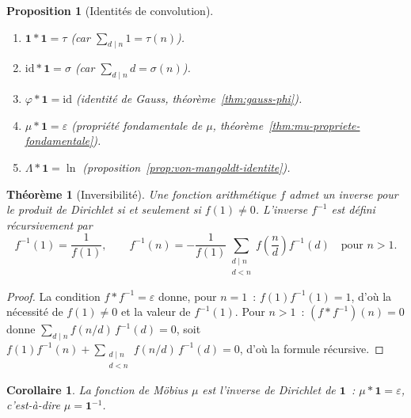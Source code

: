 \documentclass[12pt,a4paper,openany]{book}
\theoremstyle{definition}
\theoremstyle{plain}
\newtheorem{theoreme}[definition]{Théorème}
\newtheorem{proposition}[definition]{Proposition}
\newtheorem{corollaire}[definition]{Corollaire}
\theoremstyle{remark}
\begin{document}
\begin{proposition}[Identités de convolution]
\label{prop:identites-convolution}
\begin{enumerate}[label=(\roman*)]
  \item $\mathbf{1} * \mathbf{1} = \tau$ \quad
    {\small (car $\sum_{d \mid n} 1 = \tau(n)$).}
  \item $\mathrm{id} * \mathbf{1} = \sigma$ \quad
    {\small (car $\sum_{d \mid n} d = \sigma(n)$).}
  \item $\varphi * \mathbf{1} = \mathrm{id}$ \quad
    {\small (identité de Gauss, théorème~\ref{thm:gauss-phi}).}
  \item $\mu * \mathbf{1} = \varepsilon$ \quad
    {\small (propriété fondamentale de $\mu$, théorème~\ref{thm:mu-propriete-fondamentale}).}
  \item $\Lambda * \mathbf{1} = \ln$ \quad
    {\small (proposition~\ref{prop:von-mangoldt-identite}).}
\end{enumerate}
\end{proposition}

\begin{theoreme}[Inversibilité]
\label{thm:inversibilite-dirichlet}
Une fonction arithmétique $f$ admet un inverse pour le produit de Dirichlet si et
seulement si $f(1) \neq 0$. L'inverse $f^{-1}$ est défini récursivement par
\[
  f^{-1}(1) = \frac{1}{f(1)}, \qquad
  f^{-1}(n) = -\frac{1}{f(1)} \sum_{\substack{d \mid n \\ d < n}}
    f\!\left(\frac{n}{d}\right) f^{-1}(d) \quad \text{pour } n > 1.
\]
\end{theoreme}

\begin{proof}
La condition $f * f^{-1} = \varepsilon$ donne, pour $n = 1$~:
$f(1)f^{-1}(1) = 1$, d'où la nécessité de $f(1) \neq 0$ et la valeur de $f^{-1}(1)$.
Pour $n > 1$~: $(f*f^{-1})(n) = 0$ donne $\sum_{d \mid n} f(n/d)\,f^{-1}(d) = 0$, soit
$f(1)f^{-1}(n) + \sum_{\substack{d \mid n \\ d < n}} f(n/d)\,f^{-1}(d) = 0$,
d'où la formule récursive.
\end{proof}

\begin{corollaire}
\label{cor:mu-inverse-1}
La fonction de Möbius $\mu$ est l'inverse de Dirichlet de $\mathbf{1}$~:
$\mu * \mathbf{1} = \varepsilon$, c'est-à-dire $\mu = \mathbf{1}^{-1}$.
\end{corollaire}
\end{document}

